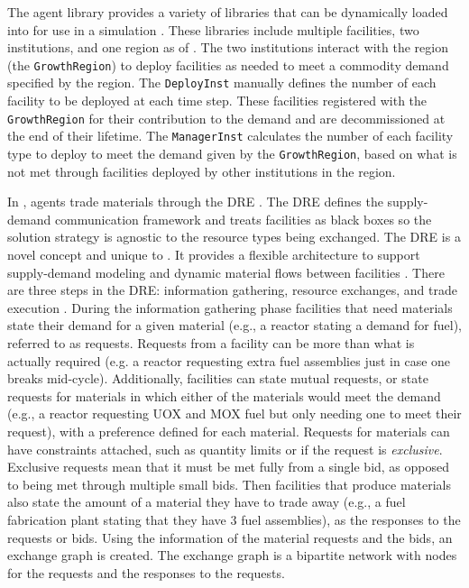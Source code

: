 The \Cycamore agent library provides a variety of libraries that can be 
dynamically loaded into \Cyclus for use in a simulation 
\cite{huff_fundamental_2016,carlsen_cycamore_2014}. These libraries 
include multiple facilities, two institutions, and one region as of 
 \cite{huff_fundamental_2016}. The two institutions interact 
with the region (the \Cycamore \texttt{GrowthRegion}) to deploy 
facilities as needed to meet a commodity demand specified by the region. 
The \Cycamore \texttt{DeployInst} manually defines the number of each 
facility to be deployed at each time step. These facilities 
registered with the \Cycamore \texttt{GrowthRegion} for their 
contribution to the demand and are decommissioned at the end of their 
lifetime. The 
\Cycamore \texttt{ManagerInst} calculates the number of each facility 
type to deploy to meet the demand given by the \texttt{GrowthRegion}, 
based on what is not met through facilities deployed by other institutions 
in the region.  

In \Cyclus, agents trade materials through the \gls{DRE} 
\cite{gidden_agent-based_2015,huff_fundamental_2016}. The \gls{DRE} defines the 
supply-demand communication framework and treats facilities as black boxes
so the solution strategy is agnostic to the resource types being exchanged. 
The \gls{DRE} is a novel concept and unique to \Cyclus. It provides a 
flexible architecture to support supply-demand modeling and dynamic 
material flows between facilities \cite{huff_fundamental_2016}. 
There are three steps in the \gls{DRE}: information gathering, resource 
exchanges, and trade execution \cite{gidden_agent-based_2015}. 
During the information gathering 
phase facilities that need materials state their demand for a given 
material (e.g., a reactor stating a demand for fuel), referred to 
as requests. Requests 
from a facility can be more than what is actually required (e.g. a reactor
requesting extra fuel assemblies just in case one breaks mid-cycle). Additionally, 
facilities can state mutual requests, or state requests for materials in 
which either of the materials would meet the demand (e.g., a reactor 
requesting UOX and MOX fuel but only needing one to meet their request), with 
a preference defined for each material. Requests for materials can have 
constraints attached, such as quantity limits or if the request is 
\textit{exclusive}. Exclusive requests mean that it must be met fully 
from a single bid, as opposed to being met through multiple small 
bids. Then facilities that produce materials also state the amount of a 
material they have to trade away (e.g., a fuel fabrication plant stating 
that they have 3 fuel assemblies), as the responses to the requests or 
bids. Using the information of the material requests and the bids, 
an exchange graph is created. The exchange graph is a 
bipartite network \cite{gidden_agent-based_2015}
with nodes for the requests and the responses to the requests. 

